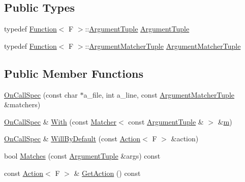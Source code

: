 \subsection*{Public Types}
\begin{DoxyCompactItemize}
\item 
typedef \hyperlink{structtesting_1_1internal_1_1Function}{Function}$<$ F $>$\+::\hyperlink{classtesting_1_1internal_1_1OnCallSpec_a70ffab8b915b7b48a90f5ce256da806f}{Argument\+Tuple} \hyperlink{classtesting_1_1internal_1_1OnCallSpec_a70ffab8b915b7b48a90f5ce256da806f}{Argument\+Tuple}
\item 
typedef \hyperlink{structtesting_1_1internal_1_1Function}{Function}$<$ F $>$\+::\hyperlink{classtesting_1_1internal_1_1OnCallSpec_a3240f159f0a9d8cda208bc256da35074}{Argument\+Matcher\+Tuple} \hyperlink{classtesting_1_1internal_1_1OnCallSpec_a3240f159f0a9d8cda208bc256da35074}{Argument\+Matcher\+Tuple}
\end{DoxyCompactItemize}
\subsection*{Public Member Functions}
\begin{DoxyCompactItemize}
\item 
\hyperlink{classtesting_1_1internal_1_1OnCallSpec_ac7077e8162a10714e463b64a3cc7d054}{On\+Call\+Spec} (const char $\ast$a\+\_\+file, int a\+\_\+line, const \hyperlink{classtesting_1_1internal_1_1OnCallSpec_a3240f159f0a9d8cda208bc256da35074}{Argument\+Matcher\+Tuple} \&matchers)
\item 
\hyperlink{classtesting_1_1internal_1_1OnCallSpec}{On\+Call\+Spec} \& \hyperlink{classtesting_1_1internal_1_1OnCallSpec_a2421cc9ac5c954a3a4c9275c35771bad}{With} (const \hyperlink{classtesting_1_1Matcher}{Matcher}$<$ const \hyperlink{classtesting_1_1internal_1_1OnCallSpec_a70ffab8b915b7b48a90f5ce256da806f}{Argument\+Tuple} \& $>$ \&\hyperlink{app_2main_8cpp_a0d2d8836216fc94b61aa0824eb239db2}{m})
\item 
\hyperlink{classtesting_1_1internal_1_1OnCallSpec}{On\+Call\+Spec} \& \hyperlink{classtesting_1_1internal_1_1OnCallSpec_a1c6303bf46983f20f4d2a61752fa8663}{Will\+By\+Default} (const \hyperlink{classtesting_1_1Action}{Action}$<$ F $>$ \&action)
\item 
bool \hyperlink{classtesting_1_1internal_1_1OnCallSpec_a98603357e18be6450cd2154853bea3f7}{Matches} (const \hyperlink{classtesting_1_1internal_1_1OnCallSpec_a70ffab8b915b7b48a90f5ce256da806f}{Argument\+Tuple} \&args) const 
\item 
const \hyperlink{classtesting_1_1Action}{Action}$<$ F $>$ \& \hyperlink{classtesting_1_1internal_1_1OnCallSpec_ad560cd3f669be59d1159a962c76ba9b7}{Get\+Action} () const 
\end{DoxyCompactItemize}
